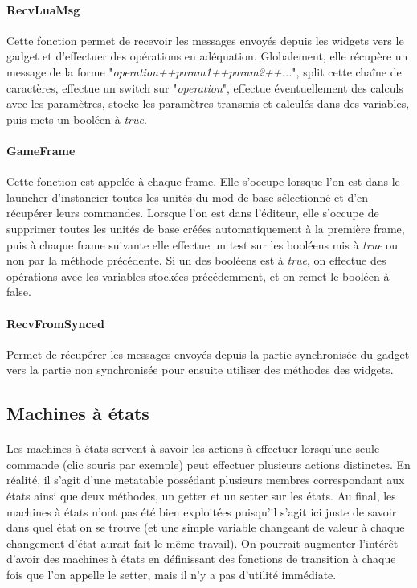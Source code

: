 \documentclass[a4paper]{article}
\begin{document}
\paragraph{RecvLuaMsg} Cette fonction permet de recevoir les messages envoyés depuis les widgets vers le gadget et d'effectuer des opérations en adéquation. Globalement, elle récupère un message de la forme "\textit{operation++param1++param2++...}", split cette chaîne de caractères, effectue un switch sur "\textit{operation}", effectue éventuellement des calculs avec les paramètres, stocke les paramètres transmis et calculés dans des variables, puis mets un booléen à \textit{true}.
\paragraph{GameFrame} Cette fonction est appelée à chaque frame. Elle s'occupe lorsque l'on est dans le launcher d'instancier toutes les unités du mod de base sélectionné et d'en récupérer leurs commandes. Lorsque l'on est dans l'éditeur, elle s'occupe de supprimer toutes les unités de base créées automatiquement à la première frame, puis à chaque frame suivante elle effectue un test sur les booléens mis à \textit{true} ou non par la méthode précédente. Si un des booléens est à \textit{true}, on effectue des opérations avec les variables stockées précédemment, et on remet le booléen à false.
\paragraph{RecvFromSynced} Permet de récupérer les messages envoyés depuis la partie synchronisée du gadget vers la partie non synchronisée pour ensuite utiliser des méthodes des widgets.
\subsection{Machines à états\label{statemachine}}
\paragraph{ }
Les machines à états servent à savoir les actions à effectuer lorsqu'une seule commande (clic souris par exemple) peut effectuer plusieurs actions distinctes. En réalité, il s'agit d'une metatable possédant plusieurs membres correspondant aux états ainsi que deux méthodes, un getter et un setter sur les états. Au final, les machines à états n'ont pas été bien exploitées puisqu'il s'agit ici juste de savoir dans quel état on se trouve (et une simple variable changeant de valeur à chaque changement d'état aurait fait le même travail). On pourrait augmenter l'intérêt d'avoir des machines à états en définissant des fonctions de transition à chaque fois que l'on appelle le setter, mais il n'y a pas d'utilité immédiate.
\end{document}
